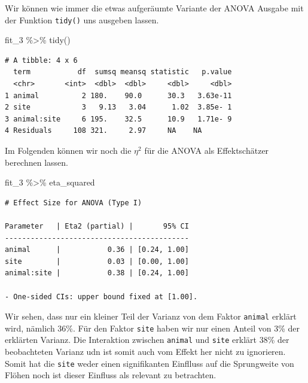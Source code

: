 \documentclass[
  letterpaper,
  DIV=11,
  oneside]{scrreport}
\newenvironment{Shaded}{\begin{snugshade}}{\end{snugshade}}
\newcommand{\FunctionTok}[1]{\textcolor[rgb]{0.28,0.35,0.67}{#1}}
\newcommand{\NormalTok}[1]{\textcolor[rgb]{0.00,0.23,0.31}{#1}}
\newcommand{\SpecialCharTok}[1]{\textcolor[rgb]{0.37,0.37,0.37}{#1}}
\begin{document}
{}

Wir können wie immer die etwas aufgeräumte Variante der ANOVA Ausgabe
mit der Funktion \texttt{tidy()} uns ausgeben lassen.

\begin{Shaded}
\begin{Highlighting}[]
\NormalTok{fit\_3 }\SpecialCharTok{\%\textgreater{}\%} \FunctionTok{tidy}\NormalTok{()}
\end{Highlighting}
\end{Shaded}

\begin{verbatim}
# A tibble: 4 x 6
  term           df  sumsq meansq statistic   p.value
  <chr>       <int>  <dbl>  <dbl>     <dbl>     <dbl>
1 animal          2 180.    90.0      30.3   3.63e-11
2 site            3   9.13   3.04      1.02  3.85e- 1
3 animal:site     6 195.    32.5      10.9   1.71e- 9
4 Residuals     108 321.     2.97     NA    NA       
\end{verbatim}

Im Folgenden können wir noch die \(\eta^2\) für die ANOVA als
Effektschätzer berechnen lassen.

\begin{Shaded}
\begin{Highlighting}[]
\NormalTok{fit\_3 }\SpecialCharTok{\%\textgreater{}\%}\NormalTok{ eta\_squared}
\end{Highlighting}
\end{Shaded}

\begin{verbatim}
# Effect Size for ANOVA (Type I)

Parameter   | Eta2 (partial) |       95% CI
-------------------------------------------
animal      |           0.36 | [0.24, 1.00]
site        |           0.03 | [0.00, 1.00]
animal:site |           0.38 | [0.24, 1.00]

- One-sided CIs: upper bound fixed at [1.00].
\end{verbatim}

Wir sehen, dass nur ein kleiner Teil der Varianz von dem Faktor
\texttt{animal} erklärt wird, nämlich 36\%. Für den Faktor \texttt{site}
haben wir nur einen Anteil von 3\% der erklärten Varianz. Die
Interaktion zwischen \texttt{animal} und \texttt{site} erklärt 38\% der
beobachteten Varianz udn ist somit auch vom Effekt her nicht zu
ignorieren. Somit hat die \texttt{site} weder einen signifikanten
Einflluss auf die Sprungweite von Flöhen noch ist dieser Einfluss als
relevant zu betrachten.
\end{document}
